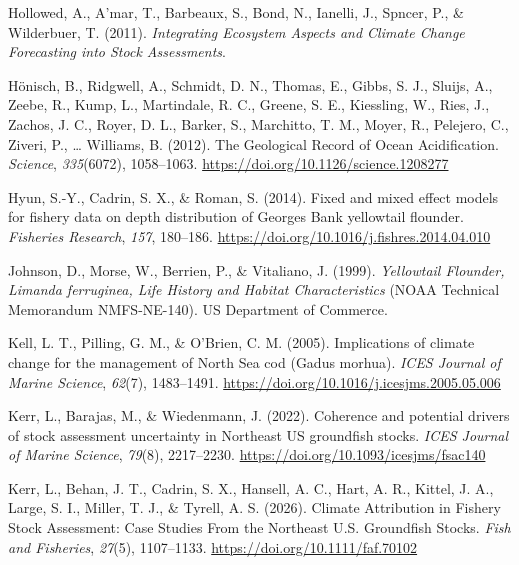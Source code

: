 \documentclass[
  12pt,
]{article}
\newlength{\cslhangindent}
\newenvironment{CSLReferences}[2] %
 {\begin{list}{}{%
  \setlength{\itemindent}{0pt}
  \setlength{\leftmargin}{0pt}
  \setlength{\parsep}{0pt}
  \ifodd #1
   \setlength{\leftmargin}{\cslhangindent}
   \setlength{\itemindent}{-1\cslhangindent}
  \fi
  \setlength{\itemsep}{#2\baselineskip}}}
 {\end{list}}
\begin{document}
\begin{CSLReferences}{1}{2}
Hollowed, A., A'mar, T., Barbeaux, S., Bond, N., Ianelli, J., Spncer, P., \& Wilderbuer, T. (2011). \emph{Integrating {Ecosystem Aspects} and {Climate Change Forecasting} into {Stock Assessments}}.

Hönisch, B., Ridgwell, A., Schmidt, D. N., Thomas, E., Gibbs, S. J., Sluijs, A., Zeebe, R., Kump, L., Martindale, R. C., Greene, S. E., Kiessling, W., Ries, J., Zachos, J. C., Royer, D. L., Barker, S., Marchitto, T. M., Moyer, R., Pelejero, C., Ziveri, P., \ldots{} Williams, B. (2012). The {Geological Record} of {Ocean Acidification}. \emph{Science}, \emph{335}(6072), 1058--1063. \url{https://doi.org/10.1126/science.1208277}

Hyun, S.-Y., Cadrin, S. X., \& Roman, S. (2014). Fixed and mixed effect models for fishery data on depth distribution of Georges Bank yellowtail flounder. \emph{Fisheries Research}, \emph{157}, 180--186. \url{https://doi.org/10.1016/j.fishres.2014.04.010}

Johnson, D., Morse, W., Berrien, P., \& Vitaliano, J. (1999). \emph{Yellowtail {Flounder}, {Limanda} ferruginea, {Life History} and {Habitat Characteristics}} (NOAA Technical Memorandum NMFS-NE-140). US Department of Commerce.

Kell, L. T., Pilling, G. M., \& O'Brien, C. M. (2005). Implications of climate change for the management of {North Sea} cod ({Gadus} morhua). \emph{ICES Journal of Marine Science}, \emph{62}(7), 1483--1491. \url{https://doi.org/10.1016/j.icesjms.2005.05.006}

Kerr, L., Barajas, M., \& Wiedenmann, J. (2022). Coherence and potential drivers of stock assessment uncertainty in Northeast US groundfish stocks. \emph{ICES Journal of Marine Science}, \emph{79}(8), 2217--2230. \url{https://doi.org/10.1093/icesjms/fsac140}

Kerr, L., Behan, J. T., Cadrin, S. X., Hansell, A. C., Hart, A. R., Kittel, J. A., Large, S. I., Miller, T. J., \& Tyrell, A. S. (2026). Climate {Attribution} in {Fishery Stock Assessment}: {Case Studies From} the {Northeast U}.{S}. {Groundfish Stocks}. \emph{Fish and Fisheries}, \emph{27}(5), 1107--1133. \url{https://doi.org/10.1111/faf.70102}


\end{CSLReferences}
\end{document}
